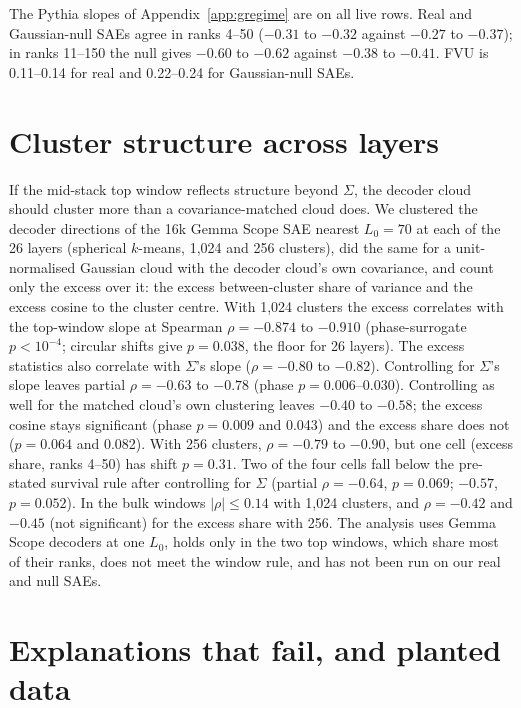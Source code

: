 \documentclass[10pt,twocolumn]{article}
\newcommand{\Sig}{\Sigma}
\newcommand{\Lz}{L_0}
\begin{document}
The Pythia slopes of Appendix~\ref{app:gregime} are on all live rows. Real and Gaussian-null SAEs agree in ranks 4--50 ($-0.31$ to $-0.32$ against $-0.27$ to $-0.37$); in ranks 11--150 the null gives $-0.60$ to $-0.62$ against $-0.38$ to $-0.41$. FVU is 0.11--0.14 for real and 0.22--0.24 for Gaussian-null SAEs.

\section{Cluster structure across layers}
\label{app:cluster}

If the mid-stack top window reflects structure beyond $\Sig$, the decoder cloud should cluster more than a covariance-matched cloud does. We clustered the decoder directions of the 16k Gemma Scope SAE nearest $\Lz=70$ at each of the 26 layers (spherical $k$-means, 1,024 and 256 clusters), did the same for a unit-normalised Gaussian cloud with the decoder cloud's own covariance, and count only the excess over it: the excess between-cluster share of variance and the excess cosine to the cluster centre. With 1,024 clusters the excess correlates with the top-window slope at Spearman $\rho=-0.874$ to $-0.910$ (phase-surrogate $p<10^{-4}$; circular shifts give $p=0.038$, the floor for 26 layers). The excess statistics also correlate with $\Sig$'s slope ($\rho=-0.80$ to $-0.82$). Controlling for $\Sig$'s slope leaves partial $\rho=-0.63$ to $-0.78$ (phase $p=0.006$--0.030). Controlling as well for the matched cloud's own clustering leaves $-0.40$ to $-0.58$; the excess cosine stays significant (phase $p=0.009$ and 0.043) and the excess share does not ($p=0.064$ and 0.082). With 256 clusters, $\rho=-0.79$ to $-0.90$, but one cell (excess share, ranks 4--50) has shift $p=0.31$. Two of the four cells fall below the pre-stated survival rule after controlling for $\Sig$ (partial $\rho=-0.64$, $p=0.069$; $-0.57$, $p=0.052$). In the bulk windows $|\rho| \le 0.14$ with 1,024 clusters, and $\rho=-0.42$ and $-0.45$ (not significant) for the excess share with 256. The analysis uses Gemma Scope decoders at one $\Lz$, holds only in the two top windows, which share most of their ranks, does not meet the window rule, and has not been run on our real and null SAEs.

\clearpage

\section{Explanations that fail, and planted data}
\label{app:fail}
\end{document}
